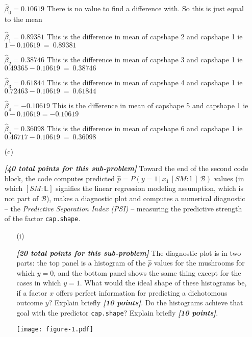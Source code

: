 \documentclass[12pt]{article}
\newcommand{\given}{\, | \,}
\newcommand{\bi}[1]{\b{\i{#1}}}
\renewcommand{\b}[1]{\textbf{#1}}
\renewcommand{\i}[1]{\textit{#1}}
\begin{document}
\begin{itemize}
\begin{table}[t!]
\label{t:data-analysis-1}

\end{table}

{\color{blue}

$\hat{ \beta }_0 = 0.10619$ There is no value to find a difference with. So this is just equal to the mean

$\hat{ \beta }_1 = 0.89381$ This is the difference in mean of capshape 2 and capshape 1 ie $1-0.10619~=~0.89381$

$\hat{ \beta }_2 = 0.38746$ This is the difference in mean of capshape 3 and capshape 1 ie $0.49365-0.10619~=~0.38746$

$\hat{ \beta }_3 = 0.61844$ This is the difference in mean of capshape 4 and capshape 1 ie $0.72463-0.10619~=~0.61844$

$\hat{ \beta }_4 = -0.10619$ This is the difference in mean of capshape 5 and capshape 1 ie $0-0.10619=-0.10619$

$\hat{ \beta }_5 = 0.36098$ This is the difference in mean of capshape 6 and capshape 1 ie $0.46717-0.10619~=~0.36098$
}

\item[(c)]

\bi{[40 total points for this sub-problem]} Toward the end of the second code block, the code computes predicted $\hat{ p } = P ( y = 1 \given x_1 \, [ SM \! \! : \! \mathbb{ L } ] \, \mathcal{ B } )$ values (in which $[ SM \! \! : \! \mathbb{ L } ]$ signifies the linear regression modeling assumption, which is not part of $\mathcal{ B }$), makes a diagnostic plot and computes a numerical diagnostic -- the \textit{Predictive Separation Index (PSI)} -- measuring the predictive strength of the factor \texttt{cap.shape}.

\begin{itemize}

\item[(i)]

\bi{[20 total points for this sub-problem]} The diagnostic plot is in two parts: the top panel is a histogram of the $\hat{ p }$ values for the mushrooms for which $y = 0$, and the bottom panel shows the same thing except for the cases in which $y = 1$. What would the ideal shape of these histograms be, if a factor $x$ offers perfect information for predicting a dichotomous outcome $y$? Explain briefly \bi{[10 points]}. Do the histograms achieve that goal with the predictor \texttt{cap.shape}? Explain briefly \bi{[10 points]}.

{\texttt{[image: figure-1.pdf]}}


\end{itemize}
\end{itemize}
\end{document}
